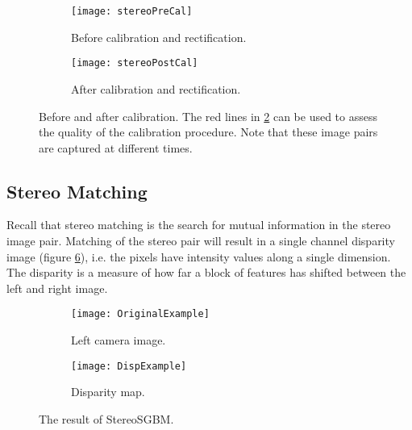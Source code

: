 \begin{figure}
	\centering
	\begin{subfigure}[b]{0.95\textwidth}
		\texttt{[image: stereoPreCal]}
		\caption{Before calibration and rectification.}
		\label{fig:stereoPreCal}
	\end{subfigure}
	\begin{subfigure}[b]{0.95\textwidth}
		\texttt{[image: stereoPostCal]}
		\caption{After calibration and rectification.}
		\label{fig:stereoPostCal}
	\end{subfigure}
	\caption{\label{fig:calibBeforeAfter}Before and after calibration. The red lines in \ref{fig:stereoPostCal} can be used to assess the quality of the calibration procedure. Note that these image pairs are captured at different times.}
\end{figure}


\subsection{Stereo Matching}

Recall that stereo matching is the search for mutual information in the stereo image pair. Matching of the stereo pair will result in a single channel disparity image (figure \ref{fig:StereoMatching}), i.e. the pixels have intensity values along a single dimension. The disparity is a measure of how far a block of features has shifted between the left and right image. 

\begin{figure}
	\centering
	\begin{subfigure}[b]{0.45\textwidth}
		\texttt{[image: OriginalExample]}
		\caption{Left camera image.}
		\label{fig:OriginalExample}
	\end{subfigure}
	\begin{subfigure}[b]{0.45\textwidth}
		\texttt{[image: DispExample]}
		\caption{Disparity map.}
		\label{fig:DispExample}
	\end{subfigure}
	\caption{\label{fig:StereoMatching}The result of StereoSGBM.}
\end{figure}

